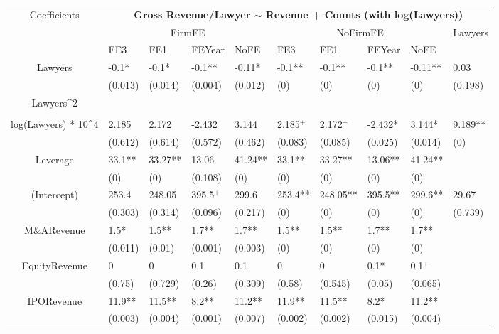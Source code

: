 \documentclass{article}
\begin{document}
\begin{table}[H]
\end{table}


\begin{table}[H]
\centering
\begin{tabular}{|clllllllll|}
\hline
\multirow{3}{*}{Coefficients} & \multicolumn{9}{c|}{\textbf{Gross Revenue/Lawyer $\sim$ Revenue + Counts (with log(Lawyers))}} \\
\cline{2-10}
& \multicolumn{4}{c}{FirmFE} & \multicolumn{4}{c}{NoFirmFE} & \multirow{2}{*}{Lawyers} \\
\cline{2-9}
& FE3 & FE1 & FEYear & NoFE & FE3 & FE1 & FEYear & NoFE &  \\
\hline
 
Lawyers & -0.1* & -0.1* & -0.1** & -0.11* & -0.1** & -0.1** & -0.1** & -0.11** & 0.03 \\ 
   & (0.013) & (0.014) & (0.004) & (0.012) & (0) & (0) & (0) & (0) & (0.198) \\ 
  Lawyers^2 &  &  &  &  &  &  &  &  &  \\ 
   &  &  &  &  &  &  &  &  &  \\ 
  log(Lawyers) * 10^4 & 2.185 & 2.172 & -2.432 & 3.144 & 2.185$^{+}$ & 2.172$^{+}$ & -2.432* & 3.144* & 9.189** \\ 
   & (0.612) & (0.614) & (0.572) & (0.462) & (0.083) & (0.085) & (0.025) & (0.014) & (0) \\ 
  Leverage & 33.1** & 33.27** & 13.06 & 41.24** & 33.1** & 33.27** & 13.06** & 41.24** &  \\ 
   & (0) & (0) & (0.108) & (0) & (0) & (0) & (0) & (0) &  \\ 
  (Intercept) & 253.4 & 248.05 & 395.5$^{+}$ & 299.6 & 253.4** & 248.05** & 395.5** & 299.6** & 29.67 \\ 
   & (0.303) & (0.314) & (0.096) & (0.217) & (0) & (0) & (0) & (0) & (0.739) \\ 
  M\&ARevenue & 1.5* & 1.5** & 1.7** & 1.7** & 1.5** & 1.5** & 1.7** & 1.7** &  \\ 
   & (0.011) & (0.01) & (0.001) & (0.003) & (0) & (0) & (0) & (0) &  \\ 
  EquityRevenue & 0 & 0 & 0.1 & 0.1 & 0 & 0 & 0.1* & 0.1$^{+}$ &  \\ 
   & (0.75) & (0.729) & (0.26) & (0.309) & (0.58) & (0.545) & (0.05) & (0.065) &  \\ 
  IPORevenue & 11.9** & 11.5** & 8.2** & 11.2** & 11.9** & 11.5** & 8.2* & 11.2** &  \\ 
   & (0.003) & (0.004) & (0.001) & (0.007) & (0.002) & (0.002) & (0.015) & (0.004) &  \\ 

\end{tabular}
\end{table}
\end{document}
